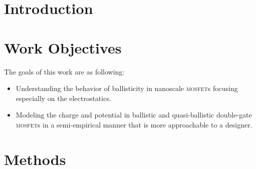 \documentclass[11pt, a4paper]{article}
\newcommand{\mosfet}{\textsc{{mosfet}}}
\newcommand{\qb}{quasi-ballistic}
\newcommand{\bal}{ballistic}
\begin{document}
\section{Introduction}
\blindtext

\section{Work Objectives}
\blindtext

The goals of this work are as following: 
\begin{itemize}
    \item Understanding the behavior of ballisticity in nanoscale \mosfet{}s focusing especially on
    the electrostatics.
    \item Modeling the charge
    and potential in \bal{} and \qb{} double-gate \mosfet{}{}s in a semi-empirical manner that is
    more approachable to a designer.
\end{itemize}

\section{Methods}
\end{document}
